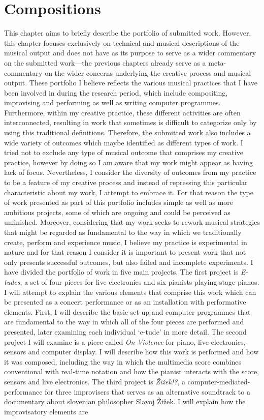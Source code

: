 \hypertarget{chapter7}{}
\chapter{Compositions}

This chapter aims to briefly describe the portfolio of submitted work. However, this chapter focuses exclusively on technical and musical descriptions of the musical output and does not have as its purpose to serve as a wider commentary on the submitted work---the previous chapters already serve as a meta-commentary on the wider concerns underlying the creative process and musical output. These portfolio I believe reflects the various musical practices that I have been involved in during the research period, which include compositing, improvising and performing as well as writing computer programmes. Furthermore, within my creative practice, these different activities are often interconnected, resulting in work that sometimes is difficult to categorize only by using this traditional definitions. Therefore, the submitted work also includes a wide variety of outcomes which maybe identified as different types of work. I tried not to exclude any type of musical outcome that comprises my creative practice, however by doing so I am aware that my work might appear as having lack of focus. Nevertheless, I consider the diversity of outcomes from my practice to be a feature of my creative process and instead of repressing this particular characteristic about my work, I attempt to embrace it. For that reason the type of work presented as part of this portfolio includes simple as well as more ambitious projects, some of which are ongoing and could be perceived as unfinished. Moreover, considering that my work seeks to rework musical strategies that might be regarded as fundamental to the way in which we traditionally create, perform and experience music, I believe my practice is experimental in nature and for that reason I consider it is important to present work that not only presents successful outcomes, but also failed and incomplete experiments. I have divided the portfolio of work in five main projects. The first project is \emph{E-tudes}, a set of four pieces for live electronics and six pianists playing stage pianos. I will attempt to explain the various elements that comprise this work which can be presented as a concert performance or as an installation with performative elements. First, I will describe the basic set-up and computer programmes that are fundamental to the way in which all of the four pieces are performed and presented, later examining each individual `e-tude' in more detail. The second project I will examine is a piece called \emph{On Violence} for piano, live electronics, sensors and computer display. I will describe how this work is performed and how it was composed, including the way in which the multimedia score combines conventional with real-time notation and how the pianist interacts with the score, sensors and live electronics. The third project is \emph{\v{Z}i\v{z}ek!?}, a computer-mediated-performance for three improvisers that serves as an alternative soundtrack to a documentary about slovenian philosopher Slavoj \v{Z}i\v{z}ek. I will explain how the improvisatory elements are 
